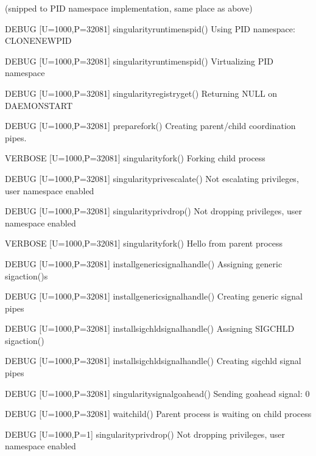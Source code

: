 \documentclass[letterpaper,10pt,english]{sphinxmanual}
\begin{document}
(snipped to PID namespace implementation, same place as above)

%
\begin{sphinxVerbatim}[commandchars=\\\{\}]
DEBUG   [U=1000,P=32081]   singularity\PYGZus{}runtime\PYGZus{}ns\PYGZus{}pid()              Using PID namespace: CLONE\PYGZus{}NEWPID

DEBUG   [U=1000,P=32081]   singularity\PYGZus{}runtime\PYGZus{}ns\PYGZus{}pid()              Virtualizing PID namespace

DEBUG   [U=1000,P=32081]   singularity\PYGZus{}registry\PYGZus{}get()                Returning NULL on \PYGZsq{}DAEMON\PYGZus{}START\PYGZsq{}

DEBUG   [U=1000,P=32081]   prepare\PYGZus{}fork()                            Creating parent/child coordination pipes.

VERBOSE [U=1000,P=32081]   singularity\PYGZus{}fork()                        Forking child process

DEBUG   [U=1000,P=32081]   singularity\PYGZus{}priv\PYGZus{}escalate()               Not escalating privileges, user namespace enabled

DEBUG   [U=1000,P=32081]   singularity\PYGZus{}priv\PYGZus{}drop()                   Not dropping privileges, user namespace enabled

VERBOSE [U=1000,P=32081]   singularity\PYGZus{}fork()                        Hello from parent process

DEBUG   [U=1000,P=32081]   install\PYGZus{}generic\PYGZus{}signal\PYGZus{}handle()           Assigning generic sigaction()s

DEBUG   [U=1000,P=32081]   install\PYGZus{}generic\PYGZus{}signal\PYGZus{}handle()           Creating generic signal pipes

DEBUG   [U=1000,P=32081]   install\PYGZus{}sigchld\PYGZus{}signal\PYGZus{}handle()           Assigning SIGCHLD sigaction()

DEBUG   [U=1000,P=32081]   install\PYGZus{}sigchld\PYGZus{}signal\PYGZus{}handle()           Creating sigchld signal pipes

DEBUG   [U=1000,P=32081]   singularity\PYGZus{}signal\PYGZus{}go\PYGZus{}ahead()             Sending go\PYGZhy{}ahead signal: 0

DEBUG   [U=1000,P=32081]   wait\PYGZus{}child()                              Parent process is waiting on child process

DEBUG   [U=1000,P=1]       singularity\PYGZus{}priv\PYGZus{}drop()                   Not dropping privileges, user namespace enabled


\end{sphinxVerbatim}
\end{document}
